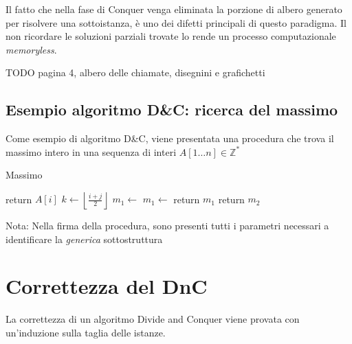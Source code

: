 Il fatto che nella fase di Conquer venga eliminata la porzione di albero generato per risolvere una sottoistanza, è uno dei difetti principali di questo paradigma. Il non ricordare le soluzioni parziali trovate lo rende un processo computazionale \textit{memoryless}.

TODO pagina 4, albero delle chiamate, disegnini e grafichetti

\subsection{Esempio algoritmo D\&C: ricerca del massimo}

Come esempio di algoritmo D\&C, viene presentata una procedura che trova il massimo intero in una sequenza di interi $A[1 \dots n] \in \mathbb{Z}^*$

\begin{algorithm}[H]
\caption{Massimo}\label{alg:max}
\begin{algorithmic}[1]
                                     
            \State return $A[i]$
        \EndIf
        \State $k \gets \left\lfloor \frac{i+j}{2} \right\rfloor$    
        \State $m_1 \gets $  
        \State $m_1 \gets $ 
                      
            \State return $m_1$
        \Else
            \State return $m_2$
        \EndIf
    \EndProcedure
\end{algorithmic}
\end{algorithm}

Nota: Nella firma della procedura, sono presenti tutti i parametri necessari a identificare la \textit{generica} sottostruttura

\section{Correttezza del DnC}

La correttezza di un algoritmo Divide and Conquer viene provata con un'induzione sulla taglia delle istanze.

